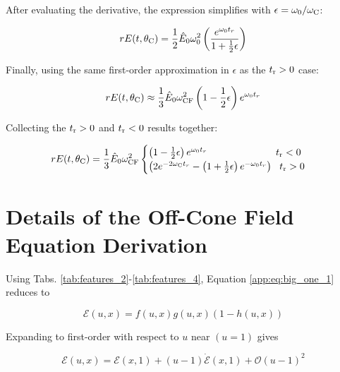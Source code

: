 \documentclass[amsmath,amssymb,aps,prd,10pt,twocolumn]{revtex4}
\begin{document}
After evaluating the derivative, the expression simplifies with $\epsilon = \omega_0/\omega_{\rm C}$:

\begin{equation}
r E(t,\theta_{\rm C}) = \frac{1}{2} \hat{E}_0 \omega_{\rm 0}^2  \left( \frac{ e^{\omega_{\rm 0} t_r} }{1 + \frac{1}{2}\epsilon } \right) \label{app:eq:yes_eps2}
\end{equation}

Finally, using the same first-order approximation in $\epsilon$ as the $t_{\rm r} > 0$ case:

\begin{equation}
r E(t,\theta_{\rm C}) \approx \frac{1}{3} \hat{E}_0 \omega_{\rm CF}^2  \left(1 - \frac{1}{2}\epsilon \right)e^{\omega_{\rm 0} t_r}
\end{equation}

Collecting the $t_{\rm r} > 0$ and $t_{\rm r} < 0$ results together:

\begin{widetext}
\begin{equation}
r E(t,\theta_{\rm C}) = \frac{1}{3} \hat{E}_0 \omega_{\rm CF}^2
\begin{cases}
\left(1 - \frac{1}{2}\epsilon \right)e^{\omega_{\rm 0} t_r} ~~~~~~~~~~~~~~~~~~~~~ t_{\rm r} < 0 \\
\left( 2 e^{-2\omega_{\rm C} t_r} - \left(1+\frac{1}{2}\epsilon \right) e^{-\omega_{\rm 0}t_r} \right) ~~ t_{\rm r} > 0
\end{cases}
\label{app:eq:on_cone}
\end{equation}
\end{widetext}

\section{Details of the Off-Cone Field Equation Derivation}
\label{app:b}

Using Tabs. \ref{tab:features_2}-\ref{tab:features_4}, Equation \ref{app:eq:big_one_1} reduces to

\begin{equation}
\mathcal{E}(u,x) = f(u,x)g(u,x)(1-h(u,x))
\end{equation}

Expanding to first-order with respect to $u$ near $(u = 1)$ gives

\begin{equation}
\mathcal{E}(u,x) = \mathcal{E}(x,1) + (u-1) \dot{\mathcal{E}}(x,1) + \mathcal{O}(u-1)^2 \label{app:eq:expand}
\end{equation}
\end{document}
